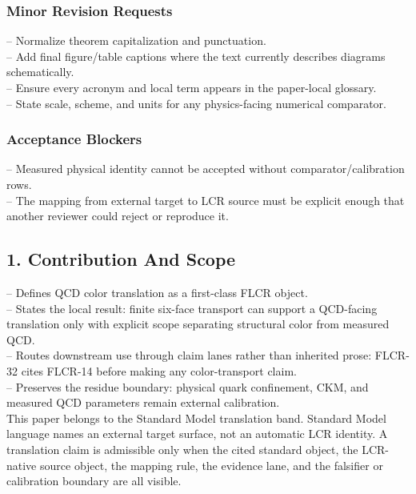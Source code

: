 \documentclass[11pt]{article}
\begin{document}
\subsubsection*{Minor Revision Requests}

\noindent{}-- Normalize theorem capitalization and punctuation.\\
\noindent{}-- Add final figure/table captions where the text currently describes diagrams schematically.\\
\noindent{}-- Ensure every acronym and local term appears in the paper-local glossary.\\
\noindent{}-- State scale, scheme, and units for any physics-facing numerical comparator.\\

\subsubsection*{Acceptance Blockers}

\noindent{}-- Measured physical identity cannot be accepted without comparator/calibration rows.\\
\noindent{}-- The mapping from external target to LCR source must be explicit enough that another reviewer could reject or reproduce it.\\


\subsection*{1. Contribution And Scope}

\noindent{}-- Defines QCD color translation as a first-class FLCR object.\\
\noindent{}-- States the local result: finite six-face transport can support a QCD-facing translation only with explicit scope separating structural color from measured QCD.\\
\noindent{}-- Routes downstream use through claim lanes rather than inherited prose: FLCR-32 cites FLCR-14 before making any color-transport claim.\\
\noindent{}-- Preserves the residue boundary: physical quark confinement, CKM, and measured QCD parameters remain external calibration.\\

This paper belongs to the Standard Model translation band. Standard Model language names an external target surface, not an automatic LCR identity. A translation claim is admissible only when the cited standard object, the LCR-native source object, the mapping rule, the evidence lane, and the falsifier or calibration boundary are all visible.
\end{document}
